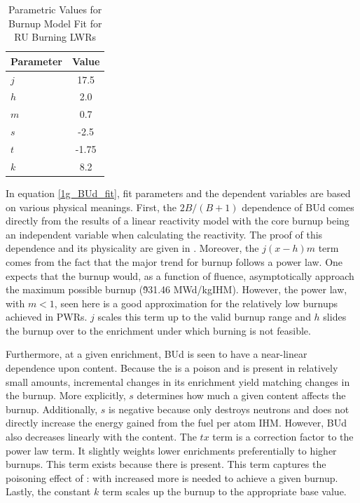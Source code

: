 \begin{table}[htbp]
\begin{center}
\caption{Parametric Values for Burnup Model Fit for RU Burning LWRs}
\label{1g_table4}
\begin{tabular}{|l|c|}
\hline
\textbf{Parameter} & \textbf{Value} \\
\hline
$j$ & 17.5 \\
$h$ & 2.0 \\
$m$ & 0.7 \\
$s$ & -2.5 \\
$t$ & -1.75 \\
$k$ & 8.2 \\
\hline
\end{tabular}
\end{center}
\end{table}

In equation \ref{1g_BUd_fit}, fit parameters and the dependent variables are based on various 
physical meanings.  First, the $2B/(B+1)$ dependence of BUd comes directly from the results of a 
linear reactivity model with the core burnup being an independent variable when calculating the 
reactivity.  The proof of this dependence and its physicality are given in \cite{Driscoll1990}. Moreover, the 
$j(x-h)m$ term comes from the fact that the major trend for burnup follows a power law. One 
expects that the burnup would, as a function of fluence, asymptotically approach the maximum 
possible burnup (\~931.46 MWd/kgIHM).  However, the power law, with $m<1$, seen here is a good 
approximation for the relatively low burnups achieved in PWRs.  $j$ scales this term up to 
the valid burnup range and $h$ slides the burnup over to the  enrichment under 
which burning is not feasible.

Furthermore, at a given  enrichment, BUd is seen to have a near-linear dependence upon 
 content.  Because the  is a poison and is present in relatively small amounts, 
incremental changes in its enrichment yield matching changes in the burnup.  More explicitly, 
$s$ determines how much a given  content affects the burnup.  Additionally, $s$ is negative 
because  only destroys neutrons and does not directly increase the energy gained from the 
fuel per atom IHM.  However, BUd also decreases linearly with the  content.  The $tx$ term 
is a correction factor to the power law term.  It slightly weights lower  enrichments 
preferentially to higher burnups.  This term exists because there is  present.  This term 
captures the poisoning effect of : with increased  more  is needed 
to achieve a given burnup.  Lastly, the constant $k$ term scales up the burnup to the appropriate base value.

